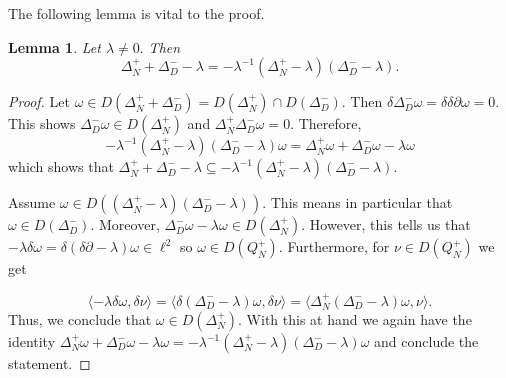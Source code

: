 \documentclass[10pt]{amsart}
\newtheorem{lemma}[theorem]{Lemma}
\theoremstyle{definition}
\begin{document}
The following lemma is vital to the proof.
\begin{lemma}\label{q = qn}
    Let $\lambda\neq 0.$ Then 
    $$\Delta^+_N+\Delta^-_D-\lambda = -\lambda^{-1}(\Delta^+_N-\lambda)(\Delta^-_D-\lambda).$$
\end{lemma}
\begin{proof}
    Let $\omega\in D(\Delta^+_N+\Delta^-_{D}) = D(\Delta^+_N)\cap D(\Delta^-_{D}).$
    Then $\delta\Delta^-_D\omega = \delta\delta\partial\omega = 0.$ This shows $\Delta^-_D\omega\in D(\Delta^+_N)$ and $\Delta^+_N\Delta^-_D\omega = 0.$ Therefore, 
    \begin{equation*}\label{x1}
        -\lambda^{-1}(\Delta^+_N-\lambda)(\Delta^-_D-\lambda)\omega = \Delta^+_N\omega+\Delta^-_D\omega-\lambda\omega
    \end{equation*} which shows that $\Delta^+_N+\Delta^-_D-\lambda\subseteq -\lambda^{-1}(\Delta^+_N-\lambda)(\Delta^-_D-\lambda).$

     Assume $\omega\in D((\Delta^+_N-\lambda)(\Delta^-_D-\lambda)).$ This means in particular that $\omega\in D(\Delta^-_D).$ Moreover, $\Delta^-_D\omega-\lambda\omega\in D(\Delta^+_N).$ However, this tells us that $-\lambda\delta\omega = \delta(\delta\partial-\lambda)\omega\in\ell^2$ so  $\omega\in D(Q^+_N).$ Furthermore, for $\nu\in D(Q^+_N)$ we get

    $$\langle -\lambda\delta\omega,\delta\nu\rangle = \langle\delta(\Delta^-_D-\lambda)\omega,\delta\nu\rangle = \langle\Delta^+_N(\Delta^-_D-\lambda)\omega,\nu\rangle.$$ Thus, we conclude that $\omega\in D(\Delta^+_N).$ With this at hand we again have the identity $\Delta^+_N\omega+\Delta^-_D\omega -\lambda\omega= -\lambda^{-1}(\Delta^+_N-\lambda)(\Delta^-_D-\lambda)\omega$ and conclude the statement.%
\end{proof}
\end{document}
